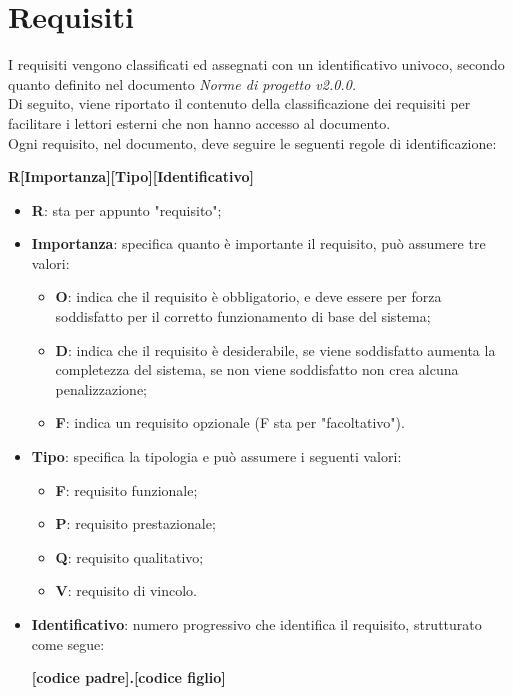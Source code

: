 \section{Requisiti}\label{Requisiti}

I requisiti vengono classificati ed assegnati con un identificativo univoco, secondo quanto definito nel documento \textit{Norme di progetto v2.0.0.}
\\
Di seguito, viene riportato il contenuto della classificazione dei requisiti per facilitare i lettori esterni che non hanno accesso al documento.
\\
Ogni requisito, nel documento, deve seguire le seguenti regole di identificazione:
\begin{center}
	\textbf{R[Importanza][Tipo][Identificativo]}
\end{center}  
\begin{itemize}
	\item \textbf{R}: sta per appunto "requisito";
	\item \textbf{Importanza}: specifica quanto è importante il requisito, può assumere tre valori:
	\begin{itemize}
		\item \textbf{O}: indica che il requisito è obbligatorio, e deve essere per forza soddisfatto per il corretto funzionamento di base del sistema;
		\item \textbf{D}: indica che il requisito è desiderabile, se viene soddisfatto aumenta la completezza del sistema, se non viene soddisfatto non crea alcuna penalizzazione;
		\item \textbf{F}: indica un requisito opzionale (F sta per "facoltativo"). 
	\end{itemize}
	\item \textbf{Tipo}: specifica la tipologia e può assumere i seguenti valori:
	\begin{itemize}
		\item \textbf{F}: requisito funzionale;
		\item \textbf{P}: requisito prestazionale;
		\item \textbf{Q}: requisito qualitativo;
		\item \textbf{V}: requisito di vincolo.
	\end{itemize}
	\item \textbf{Identificativo}: numero progressivo che identifica il requisito, strutturato come segue: 
	\begin{center}
		\textbf{[codice padre].[codice figlio]}	
	\end{center}
\end{itemize}

